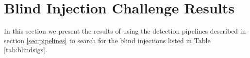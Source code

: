 % 
% 

\section{Blind Injection Challenge Results}
\label{sec:searches}

In this section we present the results of using the detection pipelines 
described in section \ref{sec:pipelines} to search for the blind injections 
listed 
in Table \ref{tab:blindsigs}.

